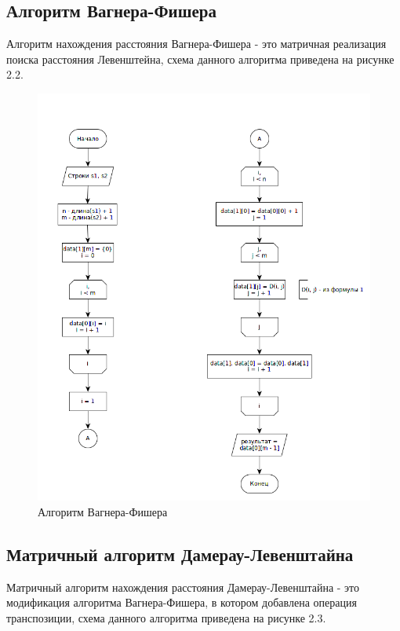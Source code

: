 \subsection{Алгоритм Вагнера-Фишера}
Алгоритм нахождения расстояния Вагнера-Фишера - это матричная реализация поиска расстояния Левенштейна, схема данного алгоритма приведена на рисунке 2.2.
\begin{figure}[H]
\centering
\includegraphics[scale=0.5]{3r}
\caption{Алгоритм Вагнера-Фишера}
\end{figure}

\subsection{Матричный алгоритм Дамерау-Левенштайна}
Матричный алгоритм нахождения расстояния Дамерау-Левенштайна - это модификация алгоритма Вагнера-Фишера, в котором добавлена операция транспозиции, схема данного алгоритма приведена на рисунке 2.3.

